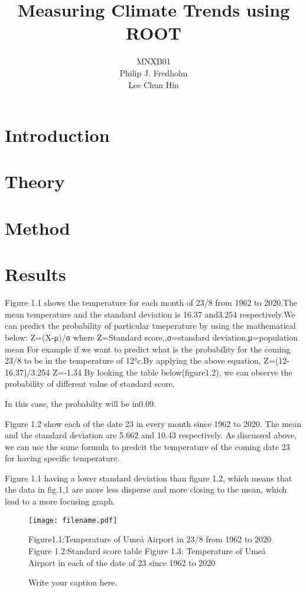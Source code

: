 \documentclass[a4, 12pt]{article}
\title{Measuring Climate Trends using ROOT}
\author{MNXB01 \\ Philip J. Fredholm \\Lee Chun Hin }
\begin{document}
\maketitle
\tableofcontents
\newpage

\section{Introduction}
\section{Theory}
\section{Method}
\section{Results}
Figure 1.1 shows the temperature for each month of 23/8 from 1962 to 2020.The mean temperature and the standard deviation is 16.37 and3.254 respectively.We can predict the probability of particular tmeperature by using the mathematical below:
Z=(X-μ)/σ where Z=Standard score,,σ=standard deviation,μ=population mean
For example if we want to predict what is the probability for the coming 23/8 to be in the temperature of 12°c.By applying the above equation,
Z=(12-16.37)/3.254
Z=-1.34
By looking the table below(figure1.2), we can observe the probability of different value of standard score.

In this case, the probabilty will be in0.09.

Figure 1.2 show each of the date 23 in every month since 1962 to 2020. The mean and the standard deviation are 5.662 and 10.43 respectively.
As discussed above, we can use the same formula to predcit the temperature of the coming date 23 for having specific temperature.

Figure 1.1 having a lower standard deviation than figure 1.2, which means that the data in fig.1,1 are more less disperse and more closing to the mean, which lead to a more focusing graph.


\begin{figure}
\centering
\texttt{[image: filename.pdf]}
\caption{Write your caption here.}
Figure1.1:Temperature of Umeå Airport in 23/8 from 1962 to 2020
Figure 1.2:Standard score table
Figure 1.3: Temperature of Umeå Airport in each of the date of 23 since 1962 to 2020
\end{figure}
\end{document}
